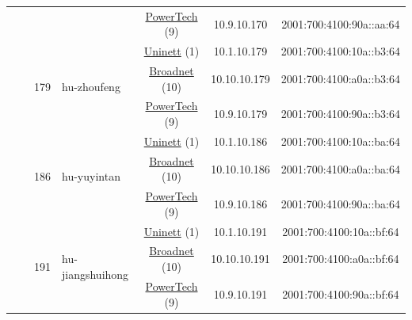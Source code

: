 \begin{small}
\begin{center}
\begin{longtable}{|c|c|c|c|c|c|c|c|}
  &  &  &  & \multicolumn{2}{|c|}{\tiny{\href{http://www.powertech.no}{PowerTech} (9)}} & \tiny{10.9.10.170} & \tiny{2001:700:4100:90a::aa:64} \\* \cline{3-3}\cline{4-4}\cline{5-5}\cline{6-6}\cline{7-7}\cline{8-8}
  &  & \multirow{3}{*}{\tiny{179}} & \multicolumn{1}{|l|}{\multirow{3}{*}{\tiny{hu-zhoufeng}}} & \multicolumn{2}{|c|}{\tiny{\href{https://www.uninett.no}{Uninett} (1)}} & \tiny{10.1.10.179} & \tiny{2001:700:4100:10a::b3:64} \\* \cline{5-5}\cline{6-6}\cline{7-7}\cline{8-8}
  &  &  &  & \multicolumn{2}{|c|}{\tiny{\href{https://www.broadnet.no}{Broadnet} (10)}} & \tiny{10.10.10.179} & \tiny{2001:700:4100:a0a::b3:64} \\* \cline{5-5}\cline{6-6}\cline{7-7}\cline{8-8}
  &  &  &  & \multicolumn{2}{|c|}{\tiny{\href{http://www.powertech.no}{PowerTech} (9)}} & \tiny{10.9.10.179} & \tiny{2001:700:4100:90a::b3:64} \\* \cline{3-3}\cline{4-4}\cline{5-5}\cline{6-6}\cline{7-7}\cline{8-8}
  &  & \multirow{3}{*}{\tiny{186}} & \multicolumn{1}{|l|}{\multirow{3}{*}{\tiny{hu-yuyintan}}} & \multicolumn{2}{|c|}{\tiny{\href{https://www.uninett.no}{Uninett} (1)}} & \tiny{10.1.10.186} & \tiny{2001:700:4100:10a::ba:64} \\* \cline{5-5}\cline{6-6}\cline{7-7}\cline{8-8}
  &  &  &  & \multicolumn{2}{|c|}{\tiny{\href{https://www.broadnet.no}{Broadnet} (10)}} & \tiny{10.10.10.186} & \tiny{2001:700:4100:a0a::ba:64} \\* \cline{5-5}\cline{6-6}\cline{7-7}\cline{8-8}
  &  &  &  & \multicolumn{2}{|c|}{\tiny{\href{http://www.powertech.no}{PowerTech} (9)}} & \tiny{10.9.10.186} & \tiny{2001:700:4100:90a::ba:64} \\* \cline{3-3}\cline{4-4}\cline{5-5}\cline{6-6}\cline{7-7}\cline{8-8}
  &  & \multirow{3}{*}{\tiny{191}} & \multicolumn{1}{|l|}{\multirow{3}{*}{\tiny{hu-jiangshuihong}}} & \multicolumn{2}{|c|}{\tiny{\href{https://www.uninett.no}{Uninett} (1)}} & \tiny{10.1.10.191} & \tiny{2001:700:4100:10a::bf:64} \\* \cline{5-5}\cline{6-6}\cline{7-7}\cline{8-8}
  &  &  &  & \multicolumn{2}{|c|}{\tiny{\href{https://www.broadnet.no}{Broadnet} (10)}} & \tiny{10.10.10.191} & \tiny{2001:700:4100:a0a::bf:64} \\* \cline{5-5}\cline{6-6}\cline{7-7}\cline{8-8}
  &  &  &  & \multicolumn{2}{|c|}{\tiny{\href{http://www.powertech.no}{PowerTech} (9)}} & \tiny{10.9.10.191} & \tiny{2001:700:4100:90a::bf:64} \\* \cline{3-3}\cline{4-4}\cline{5-5}\cline{6-6}\cline{7-7}\cline{8-8}

\end{longtable}
\end{center}
\end{small}
